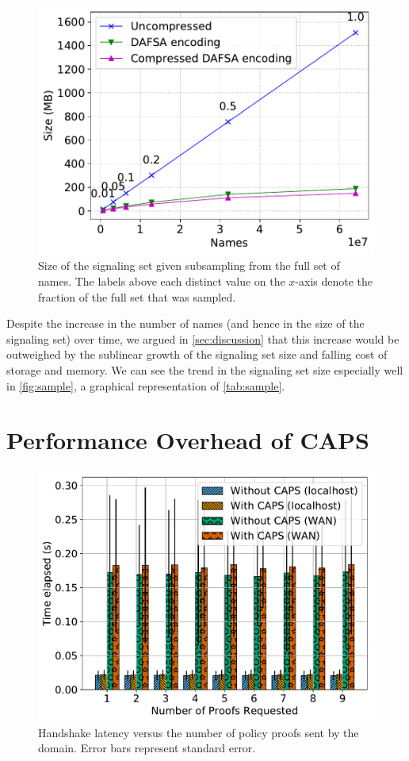\begin{figure}[t]
  \centering
  \includegraphics[width=0.95\linewidth]{fig/sample}
  \caption{Size of the signaling set given subsampling from the full set of
  names. The labels above each distinct value on the $x$-axis denote the
fraction of the full set that was sampled.}
  \label{fig:sample}
\end{figure}

Despite the increase in the number of names (and hence in the size of the
signaling set) over time, we argued in \autoref{sec:discussion} that this
increase would be outweighed by the sublinear growth of the signaling set size
and falling cost of storage and memory. We can see the trend in the signaling
set size especially well in \autoref{fig:sample}, a graphical representation of
\autoref{tab:sample}.

\section{Performance Overhead of CAPS}
\label{sec:overhead}

\begin{figure}[t]
  \centering
  \includegraphics[width=0.8\linewidth]{fig/eval_tls_ext/0-time_elapsed_vs_num_proofs_requested}
  \caption{Handshake latency versus the number of policy proofs sent by the
  domain. Error bars represent standard error.}
  \label{fig:numproofs}
\end{figure}

